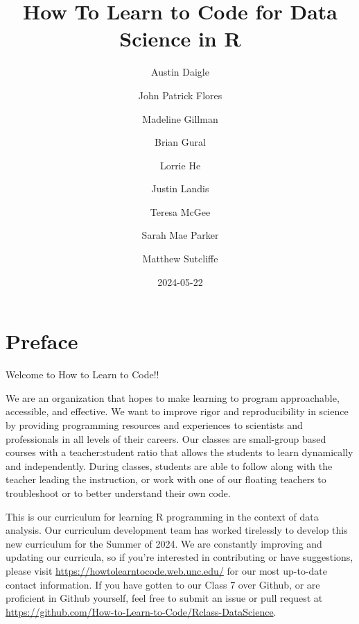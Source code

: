\documentclass[
  letterpaper,
  DIV=11,
  numbers=noendperiod]{scrreprt}
\title{How To Learn to Code for Data Science in R}
\author{Austin Daigle \and John Patrick Flores \and Madeline
Gillman \and Brian Gural \and Lorrie He \and Justin Landis \and Teresa
McGee \and Sarah Mae Parker \and Matthew Sutcliffe}
\date{2024-05-22}
\renewcommand*\contentsname{Table of contents}
\newcommand\contentsname{Table of contents}
\begin{document}
\maketitle

\renewcommand*\contentsname{Table of contents}
{
\hypersetup{linkcolor=}
\setcounter{tocdepth}{2}
\tableofcontents
}

\chapter*{Preface}\label{preface}


Welcome to How to Learn to Code!!

We are an organization that hopes to make learning to program
approachable, accessible, and effective. We want to improve rigor and
reproducibility in science by providing programming resources and
experiences to scientists and professionals in all levels of their
careers. Our classes are small-group based courses with a
teacher:student ratio that allows the students to learn dynamically and
independently. During classes, students are able to follow along with
the teacher leading the instruction, or work with one of our floating
teachers to troubleshoot or to better understand their own code.

This is our curriculum for learning R programming in the context of data
analysis. Our curriculum development team has worked tirelessly to
develop this new curriculum for the Summer of 2024. We are constantly
improving and updating our curricula, so if you're interested in
contributing or have suggestions, please visit
\url{https://howtolearntocode.web.unc.edu/} for our most up-to-date
contact information. If you have gotten to our Class 7 over Github, or
are proficient in Github yourself, feel free to submit an issue or pull
request at
\url{https://github.com/How-to-Learn-to-Code/Rclass-DataScience}.
\end{document}
